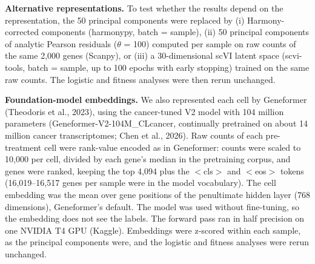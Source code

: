 \documentclass[11pt,a4paper]{article}
\begin{document}
\textbf{Alternative representations.} To test whether the results depend on the representation, the 50 principal components were replaced by (i) Harmony-corrected components (harmonypy, batch = sample), (ii) 50 principal components of analytic Pearson residuals ($\theta$ = 100) computed per sample on raw counts of the same 2,000 genes (Scanpy), or (iii) a 30-dimensional scVI latent space (scvi-tools, batch = sample, up to 100 epochs with early stopping) trained on the same raw counts. The logistic and fitness analyses were then rerun unchanged.

\textbf{Foundation-model embeddings.} We also represented each cell by Geneformer (Theodoris et al., 2023), using the cancer-tuned V2 model with 104 million parameters (Geneformer-V2-104M\_CLcancer, continually pretrained on about 14 million cancer transcriptomes; Chen et al., 2026). Raw counts of each pre-treatment cell were rank-value encoded as in Geneformer: counts were scaled to 10,000 per cell, divided by each gene's median in the pretraining corpus, and genes were ranked, keeping the top 4,094 plus the $<$cls$>$ and $<$eos$>$ tokens (16,019--16,517 genes per sample were in the model vocabulary). The cell embedding was the mean over gene positions of the penultimate hidden layer (768 dimensions), Geneformer's default. The model was used without fine-tuning, so the embedding does not see the labels. The forward pass ran in half precision on one NVIDIA T4 GPU (Kaggle). Embeddings were z-scored within each sample, as the principal components were, and the logistic and fitness analyses were rerun unchanged.
\end{document}
